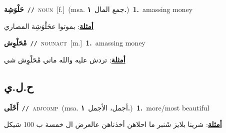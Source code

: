 \documentclass[10pt,a4paper,twoside]{article} %
\begin{document}
\begin{multicols}{2}
{\setlength\topsep{0pt}\textbf{\foreignlanguage{arabic}{حَلْوَشِة}}\ {\color{gray}\texttt{//}\color{black}}\ \textsc{noun}\ [f.]\ \color{gray}(msa. \foreignlanguage{arabic}{جمع المال}~\foreignlanguage{arabic}{\textbf{١.}})\color{black}\ \textbf{1.}~amassing money\  \begin{flushright}\color{gray}\foreignlanguage{arabic}{\textbf{\underline{\foreignlanguage{arabic}{أمثلة}}}: بموتوا عحَلْوَشِة المصاري}\end{flushright}\color{black}} \vspace{2mm}

{\setlength\topsep{0pt}\textbf{\foreignlanguage{arabic}{مْحَلْوِش}}\ {\color{gray}\texttt{//}\color{black}}\ \textsc{noun\textunderscore act}\ [m.]\ \textbf{1.}~amassing money\  \begin{flushright}\color{gray}\foreignlanguage{arabic}{\textbf{\underline{\foreignlanguage{arabic}{أمثلة}}}: تردش عليه والله ماني مْحَلْوِش شي}\end{flushright}\color{black}} \vspace{2mm}

\vspace{-3mm}
\subsection*{\color{blue}\foreignlanguage{arabic}{ح.ل.ي}\color{blue}{}} 

{\setlength\topsep{0pt}\textbf{\foreignlanguage{arabic}{أَحْلَى}}\ {\color{gray}\texttt{//}\color{black}}\ \textsc{adj\textunderscore comp}\ \color{gray}(msa. \foreignlanguage{arabic}{أجمل، الأجمل}~\foreignlanguage{arabic}{\textbf{١.}})\color{black}\ \textbf{1.}~more/most beautiful\  \begin{flushright}\color{gray}\foreignlanguage{arabic}{\textbf{\underline{\foreignlanguage{arabic}{أمثلة}}}: شرينا بلايز شَنبر ما احلاهن أخذناهن عالعرض ال خمسة ب 100 شيكل}\end{flushright}\color{black}} \vspace{2mm}


\end{multicols}
\end{document}
